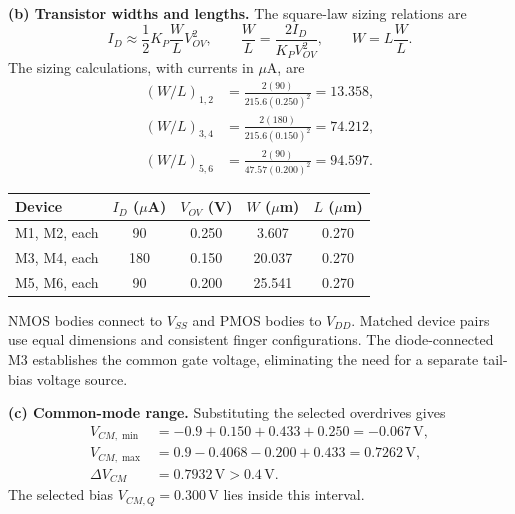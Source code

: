 \documentclass[12pt,letterpaper]{article}
\newcommand{\V}{\,\mathrm{V}}
\begin{document}
\begin{enumerate}
\textbf{(b) Transistor widths and lengths.}
The square-law sizing relations are
\[
I_D\approx\frac12 K_P\frac WL V_{OV}^2,\qquad
\frac WL=\frac{2I_D}{K_PV_{OV}^2},\qquad W=L\frac WL.
\]
The sizing calculations, with currents in $\mu$A, are
\begin{align*}
(W/L)_{1,2}&=\frac{2(90)}{215.6(0.250)^2}=13.358,\\
(W/L)_{3,4}&=\frac{2(180)}{215.6(0.150)^2}=74.212,\\
(W/L)_{5,6}&=\frac{2(90)}{47.57(0.200)^2}=94.597.
\end{align*}
\begin{center}
\small
\begin{tabular}{@{}lcccc@{}}
\toprule
Device & $I_D$ ($\mu$A) & $V_{OV}$ (V) & $W$ ($\mu$m) & $L$ ($\mu$m)\\
\midrule
M1, M2, each & 90 & 0.250 & 3.607 & 0.270\\
M3, M4, each & 180 & 0.150 & 20.037 & 0.270\\
M5, M6, each & 90 & 0.200 & 25.541 & 0.270\\
\bottomrule
\end{tabular}
\end{center}
NMOS bodies connect to $V_{SS}$ and PMOS bodies to $V_{DD}$.
Matched device pairs use equal dimensions and consistent finger
configurations. The diode-connected M3 establishes the common gate
voltage, eliminating the need for a separate tail-bias voltage source.

\textbf{(c) Common-mode range.}
Substituting the selected overdrives gives
\begin{align*}
V_{CM,\min}&=-0.9+0.150+0.433+0.250=-0.067\V,\\
V_{CM,\max}&=0.9-0.4068-0.200+0.433=0.7262\V,\\
\Delta V_{CM}&=\boxed{0.7932\V>0.4\V.}
\end{align*}
The selected bias $V_{CM,Q}=0.300\V$ lies inside this interval.


\end{enumerate}
\end{document}

